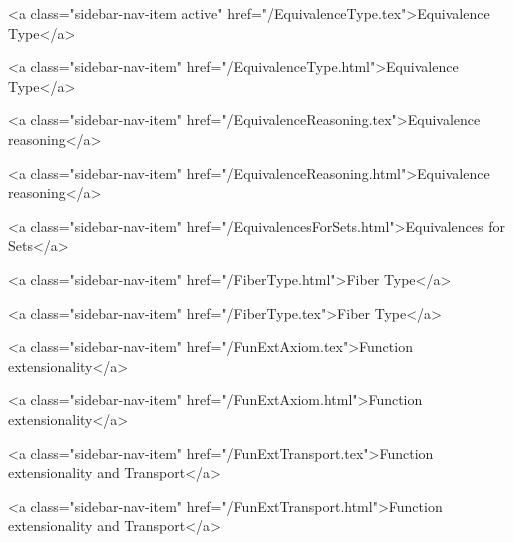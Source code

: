       
        
          <a class="sidebar-nav-item active" href="/EquivalenceType.tex">Equivalence Type</a>
        
      
    
      
        
          <a class="sidebar-nav-item" href="/EquivalenceType.html">Equivalence Type</a>
        
      
    
      
        
          <a class="sidebar-nav-item" href="/EquivalenceReasoning.tex">Equivalence reasoning</a>
        
      
    
      
        
          <a class="sidebar-nav-item" href="/EquivalenceReasoning.html">Equivalence reasoning</a>
        
      
    
      
        
          <a class="sidebar-nav-item" href="/EquivalencesForSets.html">Equivalences for Sets</a>
        
      
    
      
        
          <a class="sidebar-nav-item" href="/FiberType.html">Fiber Type</a>
        
      
    
      
        
          <a class="sidebar-nav-item" href="/FiberType.tex">Fiber Type</a>
        
      
    
      
        
          <a class="sidebar-nav-item" href="/FunExtAxiom.tex">Function extensionality</a>
        
      
    
      
        
          <a class="sidebar-nav-item" href="/FunExtAxiom.html">Function extensionality</a>
        
      
    
      
        
          <a class="sidebar-nav-item" href="/FunExtTransport.tex">Function extensionality and Transport</a>
        
      
    
      
        
          <a class="sidebar-nav-item" href="/FunExtTransport.html">Function extensionality and Transport</a>
        

